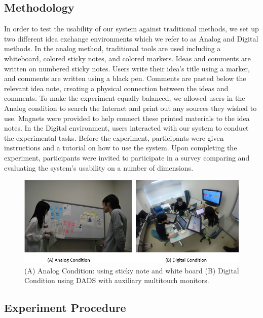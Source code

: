 \documentclass{sigchi}
\begin{document}
\subsection{Methodology}

In order to test the usability of our system against traditional methods, we set up two different idea exchange environments which we refer to as Analog and Digital methods. In the analog method, traditional tools are used including a whiteboard, colored sticky notes, and colored markers. Ideas and comments are written on numbered sticky notes. Users write their idea's title using a marker, and comments are written using a black pen. Comments are pasted below the relevant idea note, creating a physical connection between the ideas and comments. To make the experiment equally balanced, we allowed users in the Analog condition to search the Internet and print out any sources they wished to use. Magnets were provided to help connect these printed materials to the idea notes. In the Digital environment, users interacted with our system to conduct the experimental tasks. Before the experiment, participants were given instructions and a tutorial on how to use the system. Upon completing the experiment, participants were invited to participate in a survey comparing and evaluating the system's usability on a number of dimensions.

\begin{figure}[!h]
\centering
\includegraphics[width=1.0\columnwidth]{condition}
\caption{(A) Analog Condition: using sticky note and white board (B) Digital Condition using DADS with auxiliary multitouch monitors.}
\label{fig:figure1}
\end{figure}


\subsection{Experiment Procedure}
\end{document}
